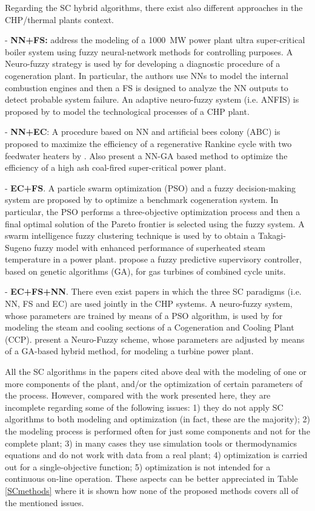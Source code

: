 Regarding the SC hybrid algorithms, there exist also different approaches in the CHP/thermal plants context. 

- \textbf{NN+FS:} \cite{Liu2010} address the modeling of a \SI{1000}{MW} power plant ultra super-critical boiler system using fuzzy neural-network methods for controlling purposes. A Neuro-fuzzy strategy is used by \cite{Bare-2005} for developing a diagnostic procedure of a cogeneration plant. In particular, the authors use NNs to model the internal combustion engines and then a FS is designed to analyze the NN outputs to detect probable system failure. An adaptive neuro-fuzzy system (i.e. ANFIS) is proposed by \cite{Mastacan-2005} to model the technological processes of a CHP plant.

- \textbf{NN+EC}: A procedure based on NN and artificial bees colony (ABC) is proposed to maximize the efficiency of a regenerative Rankine cycle with two feedwater heaters by \cite{Rashidi-2011}. Also \cite{Suresh-2011} present a NN-GA based method to optimize the efficiency of a high ash coal-fired super-critical power plant.

- \textbf{EC+FS}. A particle swarm optimization (PSO) and a fuzzy decision-making system are proposed by \cite{Sayyaadi-2011} to optimize a benchmark cogeneration system. In particular, the PSO performs a three-objective optimization process and then a final optimal solution of the Pareto frontier is selected using the fuzzy system. A swarm intelligence fuzzy clustering technique is used by \cite{Su-12} to obtain a Takagi-Sugeno fuzzy model with enhanced performance of  superheated steam temperature in a power plant. \cite{Saez-2007} propose a fuzzy predictive supervisory controller, based on genetic algorithms (GA), for gas turbines of combined cycle units.

- \textbf{EC+FS+NN}.  There even exist papers in which the three SC paradigms (i.e. NN, FS and EC) are used jointly in the CHP systems. A neuro-fuzzy system, whose parameters are trained by means of a PSO algorithm, is used by \cite{Tamiru-2009} for modeling  the steam and cooling sections of a Cogeneration and Cooling Plant (CCP). \cite{Kwun-2007} present a Neuro-Fuzzy scheme, whose parameters are adjusted by means of a GA-based hybrid method, for modeling a turbine power plant. 

All the SC algorithms in the papers cited above deal with the modeling of one or more components of the plant, and/or the optimization of certain parameters of the process. However, compared with the work presented here, they are incomplete regarding some of the following issues: 1) they do not apply SC algorithms to both modeling and optimization (in fact, these are the majority); 2) the modeling process is performed often for just some components and not for the complete plant; 3) in many cases they use simulation tools or thermodynamics equations and do not work with data from a real plant; 4) optimization is carried out for a single-objective function; 5) optimization is not intended for a continuous on-line operation. These aspects can be better appreciated in Table \ref{SCmethods} where it is shown how none of the proposed methods covers all of the mentioned issues.


